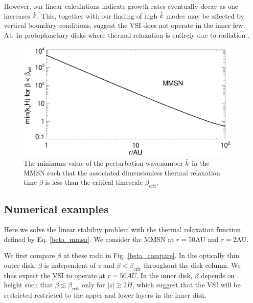 However, our linear
calculations indicate growth rates eventually decay as one increases
$\hat{k}$. This, together with our finding of high $\hat{k}$ modes may be
affected by vertical boundary conditions, suggest the VSI does not
operate in the inner few AU in protoplanetary disks where thermal
relaxation is entirely due to radiation \citep[cf.][]{stoll14}. 

\begin{figure}
  \includegraphics[width=\linewidth]{figures/bcrit_mink} 
  \caption{The minimum value of the perturbation wavenumber $\hat{k}$ in
    the MMSN such that the associated dimensionless thermal
    relaxation time  $\beta$ is  less than the critical timescale
    $\beta_\mathrm{crit}$. 
    \label{mmsn_bcrit_bcool_mink}}   
\end{figure}  


\subsection{Numerical examples}\label{mmsn_example}
Here we solve the linear stability problem with the
thermal relaxation function defined by Eq. \ref{beta_mmsn}. We
consider the MMSN at $r=50$AU and $r=2$AU. 

We first compare $\beta$ at these radii in Fig. \ref{beta_compare}. In
the optically thin outer disk, $\beta$ is independent of $z$ and
$\beta<\beta_\mathrm{crit}$ throughout the disk column. We thus expect
the VSI to operate at $r=50AU$. In the inner disk, $\beta$ depends on 
height such that $\beta\lesssim\beta_\mathrm{crit}$ only for 
$|z|\gtrsim 2H$, which suggest that the VSI will be restricted
restricted to the upper and lower layers in the inner disk.   


